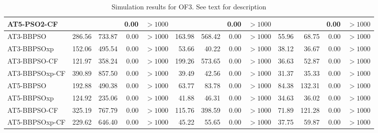 \documentclass[cmbright]{staauth}
\begin{document}
\begin{table}[ht]
\begin{tabular}{l|rrrr|rrrr|rrrr}
  AT5-PSO2-CF &  &  & 0.00 & $> 1000$ &  &  & 0.00 & $> 1000$ &  &  & 0.00 & $> 1000$ \\
   \hline
AT3-BBPSO & 286.56 & 733.87 & 0.00 & $> 1000$ & 163.98 & 568.42 & 0.00 & $> 1000$ & 55.96 & 68.75 & 0.00 & $> 1000$ \\
  AT3-BBPSOxp & 152.06 & 495.54 & 0.00 & $> 1000$ & 53.66 & 40.22 & 0.00 & $> 1000$ & 38.12 & 36.67 & 0.00 & $> 1000$ \\
  AT3-BBPSO-CF & 121.97 & 358.24 & 0.00 & $> 1000$ & 199.26 & 573.65 & 0.00 & $> 1000$ & 36.63 & 52.87 & 0.00 & $> 1000$ \\
  AT3-BBPSOxp-CF & 390.89 & 857.50 & 0.00 & $> 1000$ & 39.49 & 42.56 & 0.00 & $> 1000$ & 31.37 & 35.33 & 0.00 & $> 1000$ \\
   \hline
AT5-BBPSO & 192.88 & 490.38 & 0.00 & $> 1000$ & 63.77 & 83.78 & 0.00 & $> 1000$ & 84.38 & 132.31 & 0.00 & $> 1000$ \\
  AT5-BBPSOxp & 124.92 & 235.06 & 0.00 & $> 1000$ & 41.88 & 46.31 & 0.00 & $> 1000$ & 34.63 & 36.02 & 0.00 & $> 1000$ \\
  AT5-BBPSO-CF & 325.19 & 767.79 & 0.00 & $> 1000$ & 115.76 & 398.59 & 0.00 & $> 1000$ & 71.89 & 121.28 & 0.00 & $> 1000$ \\
  AT5-BBPSOxp-CF & 229.62 & 646.40 & 0.00 & $> 1000$ & 45.22 & 55.65 & 0.00 & $> 1000$ & 37.75 & 59.87 & 0.00 & $> 1000$ \\
   \hline
\end{tabular}
\endgroup
\caption{Simulation results for OF3. See text for description}
\label{tab:psosim3}
\end{table}
\end{document}
